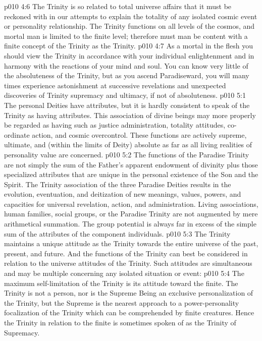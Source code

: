\vs p010 4:6 \pc The Trinity is so related to total universe affairs that it must be reckoned with in our attempts to explain the totality of any isolated cosmic event or personality relationship. The Trinity functions on all levels of the cosmos, and mortal man is limited to the finite level; therefore must man be content with a finite concept of the Trinity as the Trinity.
\vs p010 4:7 As a mortal in the flesh you should view the Trinity in accordance with your individual enlightenment and in harmony with the reactions of your mind and soul. You can know very little of the absoluteness of the Trinity, but as you ascend Paradiseward, you will many times experience astonishment at successive revelations and unexpected discoveries of Trinity supremacy and ultimacy, if not of absoluteness.
\vs p010 5:1 The personal Deities have attributes, but it is hardly consistent to speak of the Trinity as having attributes. This association of divine beings may more properly be regarded as having  such as justice administration, totality attitudes, co\hyp{}ordinate action, and cosmic overcontrol. These functions are actively supreme, ultimate, and (within the limits of Deity) absolute as far as all living realities of personality value are concerned.
\vs p010 5:2 The functions of the Paradise Trinity are not simply the sum of the Father’s apparent endowment of divinity plus those specialized attributes that are unique in the personal existence of the Son and the Spirit. The Trinity association of the three Paradise Deities results in the evolution, eventuation, and deitization of new meanings, values, powers, and capacities for universal revelation, action, and administration. Living associations, human families, social groups, or the Paradise Trinity are not augmented by mere arithmetical summation. The group potential is always far in excess of the simple sum of the attributes of the component individuals.
\vs p010 5:3 \pc The Trinity maintains a unique attitude as the Trinity towards the entire universe of the past, present, and future. And the functions of the Trinity can best be considered in relation to the universe attitudes of the Trinity. Such attitudes are simultaneous and may be multiple concerning any isolated situation or event:
\vs p010 5:4 \bibnobreakspace {} The maximum self\hyp{}limitation of the Trinity is its attitude toward the finite. The Trinity is not a person, nor is the Supreme Being an exclusive personalization of the Trinity, but the Supreme is the nearest approach to a power\hyp{}personality focalization of the Trinity which can be comprehended by finite creatures. Hence the Trinity in relation to the finite is sometimes spoken of as the Trinity of Supremacy.
